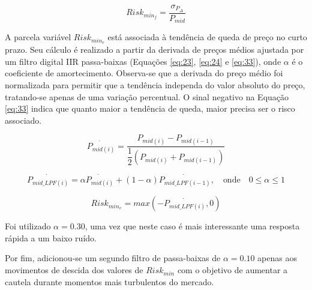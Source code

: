\begin{itemize}
    \begin{equation} \label{eq:32}
        Risk_{min_f} = \dfrac{ \sigma_{P_{\Delta}} }{ P_{mid} }
    \end{equation}

    A parcela variável \begin{math} Risk_{min_v} \end{math} está associada à tendência de queda de preço no curto prazo. Seu cálculo é realizado a partir da derivada de preços médios ajustada por um filtro digital IIR passa-baixas \cite{haykin2007signals} (Equações \ref{eq:23}, \ref{eq:24} e \ref{eq:33}), onde \begin{math} \alpha \end{math} é o coeficiente de amortecimento. Observa-se que a derivada do preço médio foi normalizada para permitir que a tendência independa do valor absoluto do preço, tratando-se apenas de uma variação percentual. O sinal negativo na Equação \ref{eq:33} indica que quanto maior a tendência de queda, maior precisa ser o risco associado.

    \begin{equation} \label{eq:23}
        \dot{P_{mid(i)}} = \dfrac{ P_{mid(i)} - P_{mid(i-1)} }{ \dfrac{1}{2}(P_{mid(i)} + P_{mid(i-1)}) }
    \end{equation}

    \begin{equation} \label{eq:24}
        \dot{P_{mid\_LPF(i)}} = \alpha \dot{P_{mid(i)}} + (1 - \alpha) \dot{P_{mid\_LPF(i-1)}},  \quad \textrm{onde} \quad 0 \le \alpha \le 1
    \end{equation}

    \begin{equation} \label{eq:33}
        Risk_{min_v} = max(-\dot{P_{mid\_LPF(i)}}, 0)
    \end{equation}

    Foi utilizado \begin{math} \alpha = 0.30 \end{math}, uma vez que neste caso é mais interessante uma resposta rápida a um baixo ruído.

    Por fim, adicionou-se um segundo filtro de passa-baixas de \begin{math} \alpha = 0.10 \end{math} apenas aos movimentos de descida dos valores de \begin{math} Risk_{min} \end{math} com o objetivo de aumentar a cautela durante momentos mais turbulentos do mercado.


\end{itemize}
